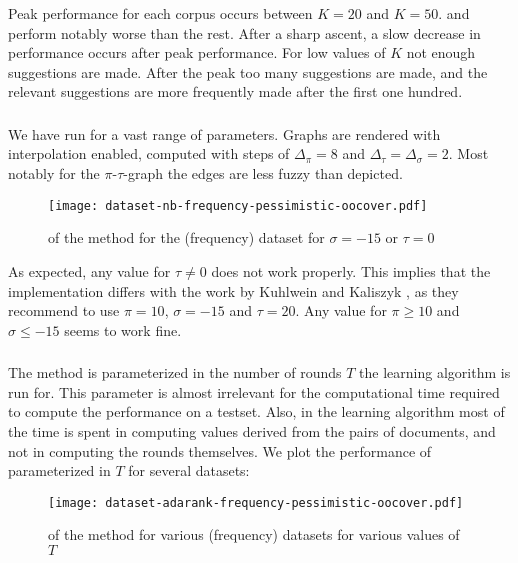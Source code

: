 Peak \oocover performance for each corpus occurs between $K=20$ and $K=50$.
\corn and \mathclasses perform notably worse than the rest.
After a sharp ascent, a slow decrease in performance occurs after peak performance.
For low values of $K$ not enough suggestions are made.
After the peak too many suggestions are made, and the relevant suggestions are more frequently made after the first one hundred.

\subsubsection{\nb}
We have run \nb for a vast range of parameters.
Graphs are rendered with interpolation enabled, computed with steps of $\Delta_\pi = 8$ and $\Delta_\tau = \Delta_\sigma = 2$.
Most notably for the $\pi$-$\tau$-graph the edges are less fuzzy than depicted.

\begin{figure}[H]
  \centering
  \texttt{[image: dataset-nb-frequency-pessimistic-oocover.pdf]}
  \caption{\oocover of the \nb method for the \corn (frequency) dataset for $\sigma = -15$ or $\tau = 0$}
\end{figure}

As expected, any value for $\tau \neq 0$ does not work properly.
This implies that the implementation differs with the work by Kuhlwein \cite{kuhlwein2013mash} and Kaliszyk \cite{kaliszyk2014machine},
as they recommend to use $\pi = 10$, $\sigma = -15$ and $\tau = 20$.
Any value for $\pi \geq 10$ and $\sigma \leq -15$ seems to work fine.

\subsubsection{\adarank}
The \adarank method is parameterized in the number of rounds $T$ the learning algorithm is run for.
This parameter is almost irrelevant for the computational time required to compute the performance on a testset.
Also, in the learning algorithm most of the time is spent in computing values derived from the pairs of documents, and not in computing the rounds themselves.
We plot the \oocover performance of \adarank parameterized in $T$ for several datasets:

\begin{figure}[H]
  \centering
  \texttt{[image: dataset-adarank-frequency-pessimistic-oocover.pdf]}
  \caption{\oocover of the \adarank method for various (frequency) datasets for various values of $T$}
\end{figure}

